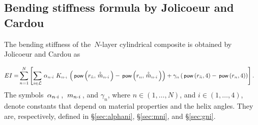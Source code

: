 \documentclass[preprint,12pt,times]{elsarticle}
\newcommand{\plus}[1]{\hat{#1}}
\newcommand{\plusplus}[1]{\plus{\plus{#1}}}
\newcommand{\minus}[1]{\check{#1}}
\numberwithin{equation}{section}
\newcommand{\pr}[1]{\left( #1 \right)}
\newcommand{\p}{\,\textsf{\small pow}}
\newcommand{\msub}[2]{
\IfEqCase{#2}{
      {i}{\, m_{#1\cdot #2}\,}%
  }[\,m_{#1\cdot {\scriptscriptstyle #2}}\,]}
\newcommand{\msubpp}[2]{
\IfEqCase{#2}{
      {i}{\, \plusplus{m}_{#1\cdot #2}\,}%
  }[\,\plusplus{m}_{#1\cdot {\scriptscriptstyle #2}}\,]}
\newcommand{\alphasub}[2]{
\IfEqCase{#2}{
		{i}{\,\alpha_{ {#1}\cdot { \scriptstyle #2}}\,}%
	}[\,\alpha_{ {#1}\cdot {\scriptscriptstyle #2}}\,]}
\newcommand{\Ksub}[2]{\,K_{ {#1}\cdot {\scriptscriptstyle #2}}\,}
\newcommand{\infour}{\in(1,\ldots,4)}
\newcommand{\inN}{\in(1,\ldots,N)}
\renewcommand{\>}{$\Rightarrow$}
\begin{document}
\subsection{Bending stiffness formula by Jolicoeur and Cardou}
\label{sec:BendingStiffness}
The bending stiffness of the~$N$-layer cylindrical composite is obtained by Jolicoeur and Cardou as

\begin{equation}
	\begin{aligned}
	EI = & \sum_{n=1}^{N} \left[ \sum_{i \in \mathcal{L}} \alphasub{n}{i} \Ksub{n}{i}  \pr{\p\pr{r_{\minus{n}},\msubpp{n}{i}} - \p\pr{r_{n},\msubpp{n}{i}}} + \gamma_{n}\pr{\p\pr{r_{\minus{n}},4} - \p\pr{r_{n},4}} \right].
	\end{aligned}
	\label{eq:EI}
\end{equation}
The symbols $\alphasub{n}{i}$, $\msub{n}{i}$, and $\gamma_{n}$, where $n\inN$, and $i\infour$, denote constants that depend on material properties and the helix angles. They are, respectively, defined in \S\ref{sec:alphani}, \S\ref{sec:mni}, and \S\ref{sec:gni}.
\end{document}
